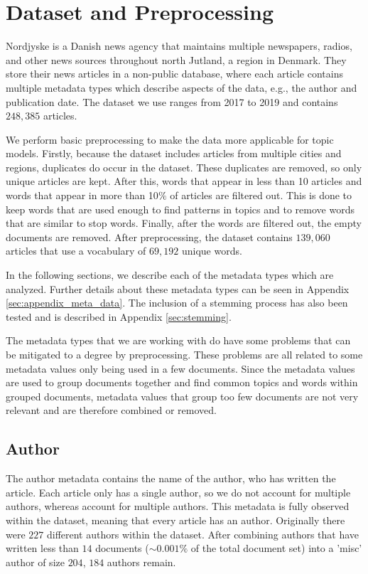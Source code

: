 \section{Dataset and Preprocessing}\label{sec:dataset}
Nordjyske is a Danish news agency that maintains multiple newspapers, radios, and other news sources throughout north Jutland, a region in Denmark.
They store their news articles in a non-public database, where each article contains multiple metadata types which describe aspects of the data, e.g., the author and publication date.
The dataset we use ranges from 2017 to 2019 and contains $248,385$ articles.

We perform basic preprocessing to make the data more applicable for topic models.
Firstly, because the dataset includes articles from multiple cities and regions, duplicates do occur in the dataset.
These duplicates are removed, so only unique articles are kept.
After this, words that appear in less than 10 articles and words that appear in more than 10$\%$ of articles are filtered out.
This is done to keep words that are used enough to find patterns in topics and to remove words that are similar to stop words.
Finally, after the words are filtered out, the empty documents are removed.
After preprocessing, the dataset contains $139,060$ articles that use a vocabulary of $69,192$ unique words.

In the following sections, we describe each of the metadata types which are analyzed.
Further details about these metadata types can be seen in Appendix \autoref{sec:appendix_meta_data}.
The inclusion of a stemming process has also been tested and is described in Appendix \autoref{sec:stemming}.

The metadata types that we are working with do have some problems that can be mitigated to a degree by preprocessing.
These problems are all related to some metadata values only being used in a few documents.
Since the metadata values are used to group documents together and find common topics and words within grouped documents, metadata values that group too few documents are not very relevant and are therefore combined or removed.

\subsection{Author}
The author metadata contains the name of the author, who has written the article.
Each article only has a single author, so we do not account for multiple authors, whereas \citet{author_topic_2012} account for multiple authors.
This metadata is fully observed within the dataset, meaning that every article has an author.
Originally there were $227$ different authors within the dataset.
After combining authors that have written less than $14$ documents (${\sim}0.001\%$ of the total document set) into a 'misc' author of size $204$, $184$ authors remain.

